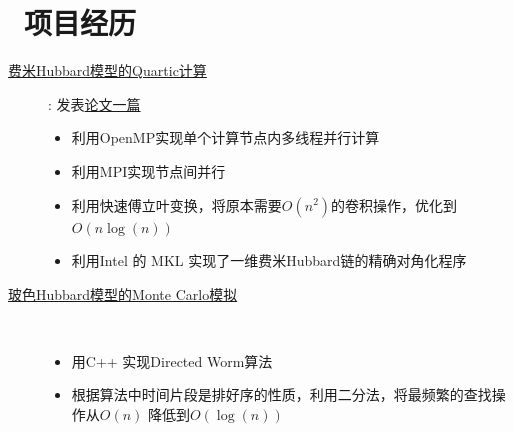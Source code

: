 \documentclass{resume}
\begin{document}
\section{\faUsers\ 项目经历}
\begin{description}
  \item[\href{https://github.com/RiceReallyGood/Quartic}{费米Hubbard模型的Quartic计算}]: 
    发表\href{https://journals.aps.org/pre/abstract/10.1103/PhysRevE.101.023310}{论文一篇}
  \begin{itemize}
    \item 利用OpenMP实现单个计算节点内多线程并行计算
    \item 利用MPI实现节点间并行
    \item 利用快速傅立叶变换，将原本需要$O(n^2)$的卷积操作，优化到$O(n \log (n))$
    \item 利用Intel 的 MKL 实现了一维费米Hubbard链的精确对角化程序
  \end{itemize} 
  \item[\href{https://github.com/RiceReallyGood/BHM_QMC}{玻色Hubbard模型的Monte Carlo模拟}]\ 
  \begin{itemize}
    \item 用C++ 实现Directed Worm算法
    \item 根据算法中时间片段是排好序的性质，利用二分法，将最频繁的查找操作从$O(n)$
    降低到$O(\log (n))$
  \end{itemize} 
\end{description}


\end{document}
